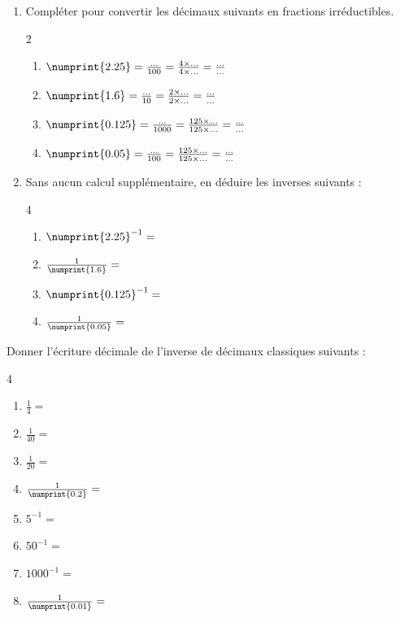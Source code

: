 \documentclass[main.tex]{subfiles}
\begin{document}
\begin{exercise}\hfill 
	\begin{enumerate}[label={\arabic*)\rule{0pt}{1.6em}},leftmargin=*]
		\item  Compléter pour convertir les décimaux suivants en fractions irréductibles.
	\begin{multicols}{2}
	\begin{enumerate}[label={\alph*)\rule{0pt}{1.6em}},leftmargin=*]
		\item $\numprint{2.25}=\frac{\ldots}{100}=\frac{4\times \ldots}{4\times \ldots }=\frac{\ldots}{\ldots}$
		\item $\numprint{1.6}=\frac{\ldots}{10}=\frac{2\times \ldots}{2\times \ldots }=\frac{\ldots}{\ldots}$ 
		\item $\numprint{0.125}=\frac{\ldots}{1000}=\frac{125\times \ldots}{125\times \ldots }=\frac{\ldots}{\ldots}$ 
		\item $\numprint{0.05}=\frac{\ldots}{100}=\frac{125\times \ldots}{125\times \ldots }=\frac{\ldots}{\ldots}$  
	\end{enumerate}
\end{multicols}
	\item Sans aucun calcul supplémentaire, en déduire les inverses suivants : 
		\begin{multicols}{4}
		\begin{enumerate}[label={\alph*)\rule{0pt}{1.8em}},leftmargin=*]
			\item $\numprint{2.25}^{-1}=$
			\item $\frac{1}{\numprint{1.6}}=$
			\item $\numprint{0.125}^{-1}=$
			\item $\frac{1}{\numprint{0.05}}=$
		\end{enumerate}
	\end{multicols}
\end{enumerate}
\end{exercise}
\begin{exercise}[\cancel{\faCalculator}] Donner l'écriture décimale de l'inverse de décimaux classiques suivants :
	
	\begin{multicols}{4}
		\begin{enumerate}[label={\alph*)\rule{0pt}{1.6em}},leftmargin=*]
			\item $\frac{1}{4}=$
			\item $\frac{1}{40}=$
			\item $\frac{1}{20}=$ 
			\item $\frac{1}{\numprint{0.2}}=$ 
			\item $5^{-1}=$
			\item $50^{-1}=$
			\item $1000^{-1}=$  
			\item $\frac{1}{\numprint{0.01}}=$ 
		\end{enumerate}
	\end{multicols}
\end{exercise}
\end{document}
